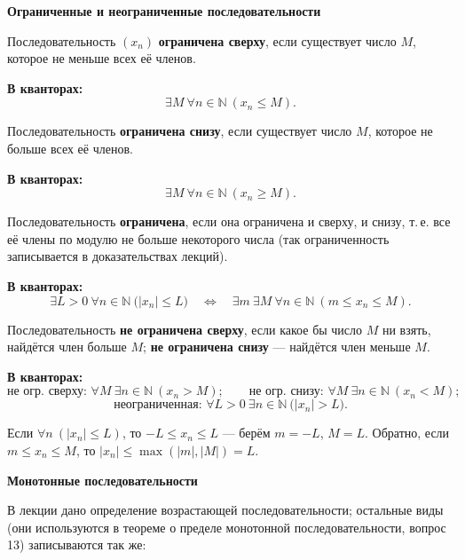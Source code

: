 \documentclass[a4paper,11pt]{article}
\newcommand{\N}{\mathbb{N}}
\newcommand{\kv}{\par\noindent\textbf{\textcolor{oprc!85!black}{В кванторах:}}}
\newcommand{\podr}[1]{\par\needspace{8\baselineskip}\medskip
  {\large\bfseries\textcolor{oprc!80!black}{#1}}\par\nopagebreak\smallskip}
\begin{document}
\podr{Ограниченные и неограниченные последовательности}

\begin{opr}
Последовательность $(x_n)$ \textbf{ограничена сверху}, если существует число $M$, которое не меньше всех её членов.
\kv
\[
  \exists M\ \forall n \in \N\ (x_n \le M).
\]
\end{opr}

\begin{opr}
Последовательность \textbf{ограничена снизу}, если существует число $M$, которое не больше всех её членов.
\kv
\[
  \exists M\ \forall n \in \N\ (x_n \ge M).
\]
\end{opr}

\begin{opr}[ограниченная]
Последовательность \textbf{ограничена}, если она ограничена и сверху, и снизу, т.\,е. все её члены
по модулю не больше некоторого числа (так ограниченность записывается в доказательствах лекций).
\kv
\[
  \exists L > 0\ \forall n \in \N\ \bigl(|x_n| \le L\bigr)
  \quad\Leftrightarrow\quad
  \exists m\ \exists M\ \forall n \in \N\ (m \le x_n \le M).
\]
\end{opr}

\begin{opr}
Последовательность \textbf{не ограничена сверху}, если какое бы число $M$ ни взять, найдётся член больше $M$;
\textbf{не ограничена снизу} --- найдётся член меньше $M$.
\kv
\[
  \text{не огр. сверху: } \forall M\ \exists n \in \N\ (x_n > M); \qquad
  \text{не огр. снизу: } \forall M\ \exists n \in \N\ (x_n < M);
\]
\[
  \text{неограниченная: } \forall L > 0\ \exists n \in \N\ \bigl(|x_n| > L\bigr).
\]
\end{opr}

\begin{dop}
Если $\forall n\ (|x_n| \le L)$, то $-L \le x_n \le L$ --- берём $m = -L$, $M = L$.
Обратно, если $m \le x_n \le M$, то $|x_n| \le \max(|m|, |M|) = L$.
\end{dop}

\podr{Монотонные последовательности}

В лекции дано определение возрастающей последовательности; остальные виды (они используются в теореме
о пределе монотонной последовательности, вопрос 13) записываются так же:
\end{document}
